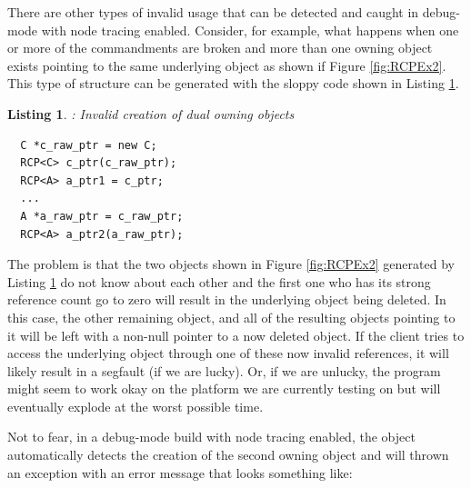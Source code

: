 \documentclass[pdf,ps2pdf,11pt]{SANDreport}
\newtheorem{listing}{Listing}
\begin{document}
There are other types of invalid usage that can be detected and caught
in debug-mode with node tracing enabled.  Consider, for example, what
happens when one or more of the commandments are broken and more than
one owning {} object exists pointing to the same
underlying {} object as shown if Figure
{}\ref{fig:RCPEx2}.  This type of structure can be generated with the
sloppy code shown in Listing {}\ref{listing:duplicate_owning_rcp}.

\begin{listing}: Invalid creation of dual owning {}
objects \\
\label{listing:duplicate_owning_rcp}
{\small\begin{verbatim}
  C *c_raw_ptr = new C;
  RCP<C> c_ptr(c_raw_ptr);
  RCP<A> a_ptr1 = c_ptr;
  ...
  A *a_raw_ptr = c_raw_ptr;
  RCP<A> a_ptr2(a_raw_ptr);
\end{verbatim}}
\end{listing}

The problem is that the two {} objects shown in
Figure {}\ref{fig:RCPEx2} generated by Listing
{}\ref{listing:duplicate_owning_rcp} do not know about each other and
the first one who has its strong reference count go to zero will
result in the underlying {} object being deleted.  In this
case, the other remaining {} object, and all of
the resulting {} objects pointing to it will be left with
a non-null pointer to a now deleted {} object.  If the
client tries to access the underlying object through one of these now
invalid references, it will likely result in a segfault (if we are
lucky).  Or, if we are unlucky, the program might seem to work okay on
the platform we are currently testing on but will eventually explode
at the worst possible time.

Not to fear, in a debug-mode build with node tracing enabled, the
{} object automatically detects the creation of
the second owning {} object and will thrown an
exception with an error message that looks something like:
\end{document}
